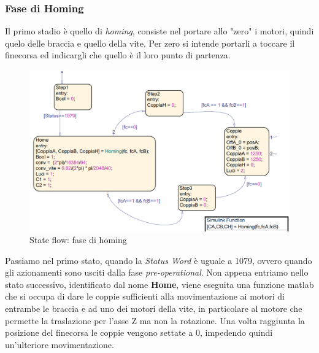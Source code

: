 \subsubsection{Fase di Homing}
Il primo stadio è quello di \textit{homing}, consiste nel portare allo "zero" i motori, quindi quelo delle braccia e quello della vite. Per zero si intende portarli a toccare il finecorsa ed indicargli che quello è il loro punto di partenza.
\begin{figure}[ht]
\begin{center}
    \includegraphics[scale=0.55]{Immagini/Sperimentale/state1.png}
    \caption{State flow: fase di homing}
\end{center}
\end{figure}
Passiamo nel primo stato, quando la \textit{Status Word} è uguale a 1079, ovvero quando gli azionamenti sono usciti dalla fase \textit{pre-operational}. Non appena entriamo nello stato successivo, identificato dal nome \textbf{Home}, viene eseguita una funzione matlab che si occupa di dare le coppie sufficienti alla movimentazione ai motori di entrambe le braccia e ad uno dei motori della vite, in particolare al motore che permette la traslazione per l'asse Z ma non la rotazione. Una volta raggiunta la posizione del finecorsa le coppie vengono settate a 0, impedendo quindi un'ulteriore movimentazione. 

